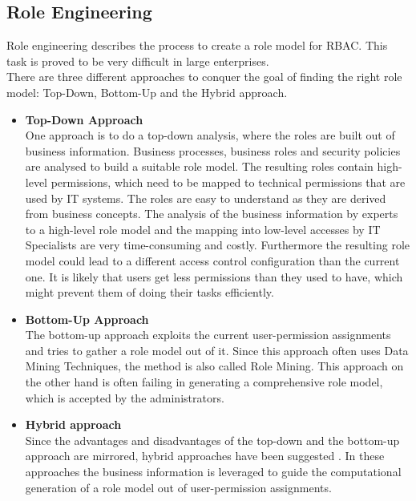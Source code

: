     \subsection{Role Engineering}
    Role engineering \cite{coyne2011role} describes the process to create a role model for RBAC. This task is proved to be very difficult in large enterprises.\\
    There are three different approaches to conquer the goal of finding the right role model: Top-Down, Bottom-Up and the Hybrid approach\cite{coyne2011role}\cite{Frank}.
    \begin{itemize}
        \item \textbf{Top-Down Approach}\\
        One approach is to do a top-down analysis, where the roles are built out of business information. Business processes, business roles and security policies are analysed to build a suitable role model. The resulting roles contain high-level permissions, which need to be mapped to technical permissions that are used by IT systems. The roles are easy to understand as they are derived from business concepts. The analysis of the business information by experts to a high-level role model and the mapping into low-level accesses by IT Specialists are very time-consuming and costly. Furthermore the resulting role model could lead to a different access control configuration than the current one. It is likely that users get less permissions than they used to have, which might prevent them of doing their tasks efficiently.
        \item \textbf{Bottom-Up Approach}\\
        The bottom-up approach exploits the current user-permission assignments and tries to gather a role model out of it. Since this approach often uses Data Mining Techniques, the method is also called Role Mining\cite{Kuhlmann}. This approach on the other hand is often failing in generating a comprehensive role model, which is accepted by the administrators\cite{Frank2013}.
        \item \textbf{Hybrid approach}\\
        Since the advantages and disadvantages of the top-down and the bottom-up approach are mirrored, hybrid approaches have been suggested \cite{Frank}\cite{6274146}. In these approaches the business information is leveraged to guide the computational generation of a role model out of user-permission assignments.
    \end{itemize}
    
